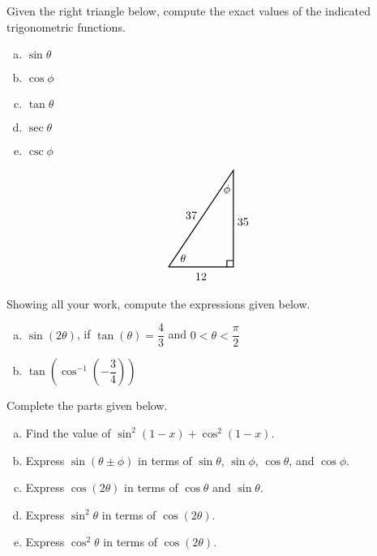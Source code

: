 \documentclass[12pt,letterpaper]{exam}
\begin{document}
\begin{questions}
\newpage
\question[10] Given the right triangle below, compute the exact values of the indicated trigonometric functions. \pspace
\begin{minipage}{0.3\textwidth}
        \begin{enumerate}[(a)]
        \item $\sin \theta$
        \item $\cos \phi$
        \item $\tan \theta$
        \item $\sec \theta$
        \item $\csc \phi$
        \end{enumerate}
\end{minipage} \begin{minipage}{0.27\textwidth}        
	\[
	\begin{tikzpicture}
	\draw[line width=0.03cm] (0,0) -- (2,0) -- (2,3) -- (0,0);
	\draw[line width=0.03cm] (1.8,0) -- (1.8,0.2) -- (2,0.2);
	\node at (0.45,0.27) {$\theta$};
	\node at (1.8,2.4) {$\phi$};
	\node at (1,-0.3) {$12$};
	\node at (2.3,1.4) {$35$};
	\node at (0.7,1.6) {$37$};
	\end{tikzpicture}
	\]
\end{minipage}



\newpage
\question[10] Showing all your work, compute the expressions given below.
	\begin{enumerate}[(a)]
	\item $\sin(2\theta)$, if $\tan(\theta)= \dfrac{4}{3}$ and $0 < \theta < \dfrac{\pi}{2}$
	\item $\tan \!\left( \cos^{-1} \left( -\dfrac{3}{4} \right) \right)$
	\end{enumerate}



\newpage
\question[10] Complete the parts given below.
	\begin{enumerate}[(a)]
	\item Find the value of $\sin^2(1 - x) + \cos^2(1 - x)$.
	\item Express $\sin(\theta \pm \phi)$ in terms of $\sin \theta$, $\sin \phi$, $\cos \theta$, and $\cos \phi$. 
	\item Express $\cos(2\theta)$ in terms of $\cos \theta$ and $\sin \theta$. 
	\item Express $\sin^2 \theta$ in terms of $\cos(2\theta)$.
	\item Express $\cos^2 \theta$ in terms of $\cos(2\theta)$. 
	\end{enumerate}




\end{questions}
\end{document}
